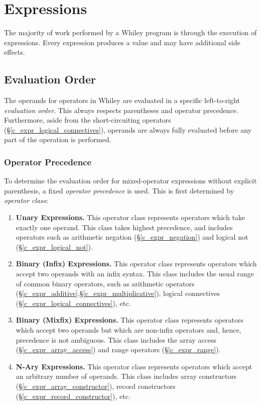 
\chapter{Expressions}
The majority of work performed by a Whiley program is through the execution of \glspl{expression}.  Every expression produces a \gls{value} and may have additional side effects.

\section{Evaluation Order}

The operands for operators in Whiley are evaluated in a specific left-to-right {\em evaluation order}.  This always respects parentheses and operator precedence.  Furthermore, aside from the short-circuiting operators (\S\ref{c_expr_logical_connectives}), operands are always fully evaluated before any part of the operation is performed.

\subsection{Operator Precedence}

To determine the evaluation order for mixed-operator expressions without explicit parenthesis, a fixed {\em operator precedence} is used.  This is first determined by {\em operator class}:

\begin{enumerate}
\item {\bf Unary Expressions.} This operator class represents operators which take exactly one operand.  This class takes highest precedence, and includes operators such as arithmetic negation (\S\ref{c_expr_negation}) and logical not (\S\ref{c_expr_logical_not}).
\item {\bf Binary (Infix) Expressions.}  This operator class represents operators which accept two operands with an infix syntax.  This class includes the usual range of common binary operators, such as arithmetic operators (\S\ref{c_expr_additive},\S\ref{c_expr_multiplicative}), logical connectives (\S\ref{c_expr_logical_connectives}), etc.

\item {\bf Binary (Mixfix) Expressions.}  This operator class represents operators which accept two operands but which are non-infix operators and, hence, precedence is not ambiguous.  This class includes the array access (\S\ref{c_expr_array_access}) and range operators (\S\ref{c_expr_range}).
\item {\bf N-Ary Expressions.}  This operator class represents operators which accept an arbitrary number of operands.  This class includes array constructors (\S\ref{c_expr_array_constructor}), record constructors (\S\ref{c_expr_record_constructor}), etc.
\end{enumerate}

